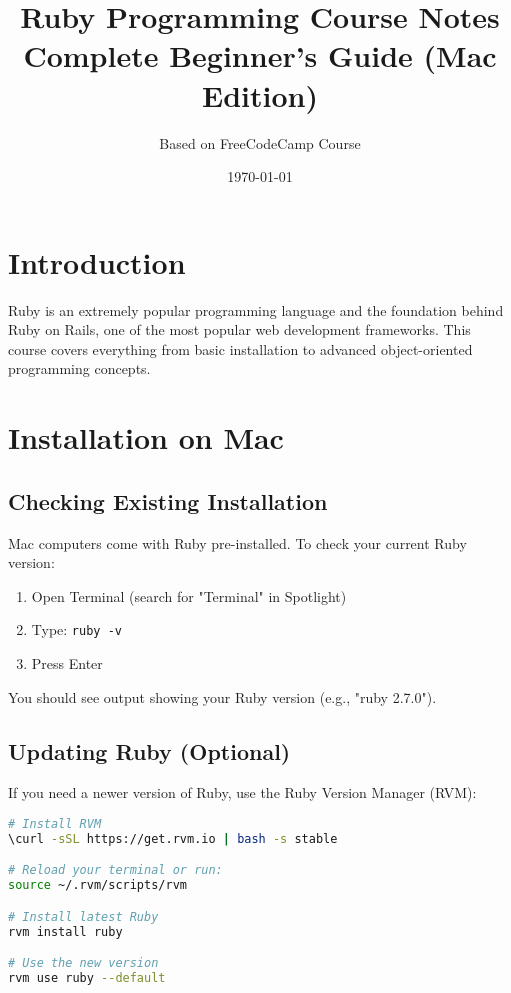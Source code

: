 \documentclass[12pt,a4paper]{article}
\title{\textbf{Ruby Programming Course Notes}\\
\large Complete Beginner's Guide (Mac Edition)}
\author{Based on FreeCodeCamp Course}
\date{\today}
\begin{document}
\maketitle
\tableofcontents
\newpage

\section{Introduction}

Ruby is an extremely popular programming language and the foundation behind Ruby on Rails, one of the most popular web development frameworks. This course covers everything from basic installation to advanced object-oriented programming concepts.

\section{Installation on Mac}

\subsection{Checking Existing Installation}
Mac computers come with Ruby pre-installed. To check your current Ruby version:

\begin{enumerate}
    \item Open Terminal (search for "Terminal" in Spotlight)
    \item Type: \texttt{ruby -v}
    \item Press Enter
\end{enumerate}

You should see output showing your Ruby version (e.g., "ruby 2.7.0").

\subsection{Updating Ruby (Optional)}
If you need a newer version of Ruby, use the Ruby Version Manager (RVM):

\begin{lstlisting}[language=bash]
# Install RVM
\curl -sSL https://get.rvm.io | bash -s stable

# Reload your terminal or run:
source ~/.rvm/scripts/rvm

# Install latest Ruby
rvm install ruby

# Use the new version
rvm use ruby --default
\end{lstlisting}
\end{document}
